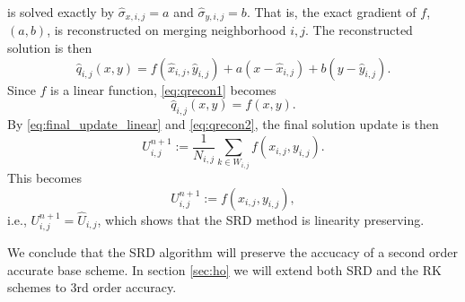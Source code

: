 is solved exactly by $\widehat{\sigma}_{x,i,j}=a$ and $\widehat{\sigma}_{y,i,j}=b$.  That is, the exact gradient of $f$, $(a,b)$, is reconstructed on merging neighborhood $i,j$.  The reconstructed solution is then
\begin{equation}
    \label{eq:qrecon1}
    \hat{q}_{i,j}(x,y) = f(\widehat{x}_{i,j},\widehat{y}_{i,j}) + a(x-\widehat{x}_{i,j})+b(y-\widehat{y}_{i,j}) .
\end{equation}
Since $f$ is a linear function, \eqref{eq:qrecon1} becomes
\begin{equation}
    \label{eq:qrecon2}
    \hat{q}_{i,j}(x,y) = f(x,y).
\end{equation}
By \eqref{eq:final_update_linear} and \eqref{eq:qrecon2}, the final solution update is then
\begin{equation} 
U^{n+1}_{i,j} := \frac{1}{N_{i,j}}\sum_{k \in W_{i,j}}f(x_{i,j},y_{i,j}).
\end{equation}
This becomes
\begin{equation} 
U^{n+1}_{i,j} := f(x_{i,j},y_{i,j}),
\end{equation}
i.e., $U^{n+1}_{i,j} = \widehat{U}_{i,j}$, which shows that the SRD method is linearity preserving.

We conclude that the SRD algorithm will preserve the accucacy of a second order accurate 
base scheme. In section \ref{sec:ho} we will extend both SRD and the RK schemes to 3rd
order accuracy.




